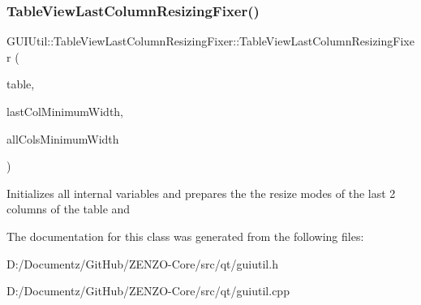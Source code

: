 \subsubsection{\texorpdfstring{TableViewLastColumnResizingFixer()}{TableViewLastColumnResizingFixer()}}
{\footnotesize\ttfamily G\+U\+I\+Util\+::\+Table\+View\+Last\+Column\+Resizing\+Fixer\+::\+Table\+View\+Last\+Column\+Resizing\+Fixer (\begin{DoxyParamCaption}\item[{Q\+Table\+View $\ast$}]{table,  }\item[{int}]{last\+Col\+Minimum\+Width,  }\item[{int}]{all\+Cols\+Minimum\+Width }\end{DoxyParamCaption})}

Initializes all internal variables and prepares the the resize modes of the last 2 columns of the table and 

The documentation for this class was generated from the following files\+:\begin{DoxyCompactItemize}
\item 
D\+:/\+Documentz/\+Git\+Hub/\+Z\+E\+N\+Z\+O-\/\+Core/src/qt/guiutil.\+h\item 
D\+:/\+Documentz/\+Git\+Hub/\+Z\+E\+N\+Z\+O-\/\+Core/src/qt/guiutil.\+cpp\end{DoxyCompactItemize}
